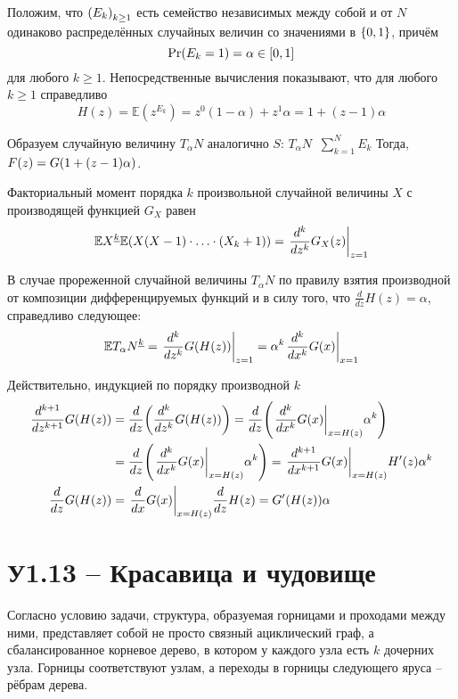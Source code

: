 \documentclass[a4paper]{article}
\let\originalleft\left
\let\originalright\right
\renewcommand{\left}{\mathopen{}\mathclose\bgroup\originalleft}
\renewcommand{\right}{\aftergroup\egroup\originalright}
\newcommand{\obj}[1]{{\left\{ #1 \right \}}}
\newcommand{\clo}[1]{{\left [ #1 \right ]}}
\newcommand{\brac}[1]{{\left ( #1 \right )}}
\newcommand{\induc}[1]{{\left . #1 \right \vert}}
\newcommand{\Ex}[0]{{\mathbb{E}}}
\newcommand{\defn}{{\mathop{\overset{\Delta}{=}}\nolimits}}
\begin{document}
Положим, что $\brac{E_k}_{k\geq 1}$ есть семейство независимых между собой и
от $N$ одинаково распределённых случайных величин со значениями в $\obj{0,1}$,
причём \[\Pr(E_k = 1) = \alpha \in \clo{0,1}\] для любого $k\geq 1$.
Непосредственные вычисления показывают, что для любого $k\geq1$ справедливо
\[H(z) = \Ex(z^{E_k}) = z^0 (1-\alpha) + z^1 \alpha = 1 + (z-1) \alpha\]

Образуем случайную величину $T_\alpha N$ аналогично $S$: $T_\alpha N \defn \sum_{k=1}^N E_k$
Тогда, $F(z) = G\brac{1 + (z-1) \alpha}$.

Факториальный момент порядка $k$ произвольной случайной величины $X$ с
производящей функцией $G_X$ равен
\[ \Ex X^{\underline{k}} \Ex\brac{X(X-1)\cdot\ldots\cdot(X_k+1)} = \induc{\frac{d^k}{dz^k} G_X(z) }_{z=1}\]

В случае прореженной случайной величины $T_\alpha N$ по правилу взятия
производной от композиции дифференцируемых функций и в силу того, что
$\frac{d}{dz}H(z) = \alpha$, справедливо следующее: 
\[\Ex {T_\alpha N}^{\underline{k}} = \induc{\frac{d^k}{dz^k} G\brac{H(z)} }_{z=1}
= \alpha^k\induc{\frac{d^k}{dx^k} G(x) }_{x=1}\]

Действительно, индукцией по порядку производной $k$ \begin{align*}
	\frac{d^{k+1}}{dz^{k+1}} G\brac{H(z)} & = \frac{d}{dz}\brac{ \frac{d^k}{dz^k} G\brac{H(z)} } = \frac{d}{dz}\brac{ \induc{\frac{d^k}{dx^k} G(x) }_{x=H(z)} \alpha^k }\\
	& = \frac{d}{dz}\brac{ \induc{\frac{d^k}{dx^k} G(x) }_{x=H(z)} \alpha^k } = \induc{\frac{d^{k+1}}{dx^{k+1}} G(x) }_{x=H(z)} H'(z) \alpha^k\\
	\frac{d}{dz} G\brac{H(z)} & = \induc{\frac{d}{dx} G(x) }_{x=H(z)} \frac{d}{dz} H(z) = G'\brac{H(z)} \alpha
\end{align*}



\section{У1.13 -- Красавица и чудовище} %
\label{sec:task_1_13}

Согласно условию задачи, структура, образуемая горницами и проходами
между ними, представляет собой не просто связный ациклический граф, а
сбалансированное корневое дерево, в котором у каждого узла есть $k$
дочерних узла.
Горницы соответствуют узлам, а переходы в горницы следующего яруса
-- рёбрам дерева.
\end{document}
